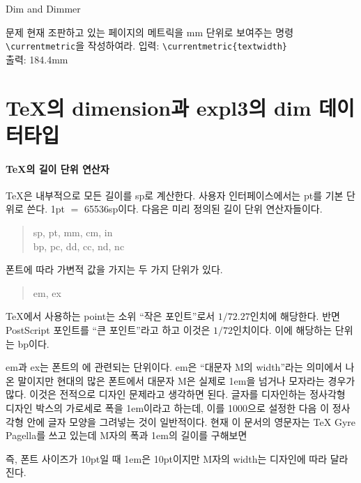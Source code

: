 \documentclass[a4paper,amsmath]{oblivoir}
\begin{document}
\begin{intro}[5]
Dim and Dimmer
\end{intro}

\begin{questiona}{문제}
현재 조판하고 있는 페이지의 메트릭을 mm 단위로 보여주는 명령 \verb|\currentmetric|을 작성하여라.
\tcblower
입력: \verb|\currentmetric{textwidth}| \\
출력: 184.4mm
\end{questiona}

\section{\TeX 의 dimension과 expl3의 \textsf{dim} 데이터타입}

\paragraph{\TeX 의 길이 단위 연산자}

\TeX 은 내부적으로 모든 길이를 sp로 계산한다. 사용자 인터페이스에서는 pt를 기본 단위로 쓴다. 1pt $ = $ 65536sp이다. 다음은 미리 정의된 길이 단위 연산자들이다.
\begin{quote}
sp, pt, mm, cm, in \\
bp, pc, dd, cc, nd, nc
\end{quote}
폰트에 따라 가변적 값을 가지는 두 가지 단위가 있다.
\begin{quote}
em, ex
\end{quote}

\TeX 에서 사용하는 point는 소위 “작은 포인트”로서 $1/72.27$인치에 해당한다. 반면 PostScript 포인트를 “큰 포인트”라고 하고 이것은 $1/72$인치이다. 이에 해당하는 단위는 bp이다.

em과 ex는 폰트의 에 관련되는 단위이다. em은 “대문자 M의 width”라는 의미에서 나온 말이지만 현대의 많은 폰트에서 대문자 M은 실제로 1em을 넘거나 모자라는 경우가 많다. 이것은 전적으로 디자인 문제라고 생각하면 된다. 글자를 디자인하는 정사각형 디자인 박스의 가로세로 폭을 1em이라고 하는데, 이를 1000으로 설정한 다음 이 정사각형 안에 글자 모양을 그려넣는 것이 일반적이다. 현재 이 문서의 영문자는 TeX Gyre Pagella를 쓰고 있는데 M자의 폭과 1em의 길이를 구해보면
즉, 폰트 사이즈가 10pt일 때 1em은 10pt이지만 M자의 width는 디자인에 따라 달라진다.
\end{document}
